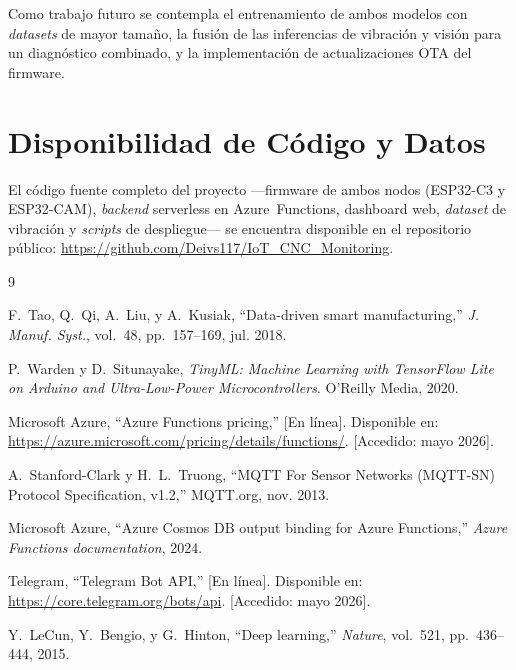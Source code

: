 \documentclass[journal,transmag]{IEEEtran}
\begin{document}
Como trabajo futuro se contempla el entrenamiento de ambos modelos con
\textit{datasets} de mayor tama\~no, la fusi\'on de las inferencias de vibraci\'on
y visi\'on para un diagn\'ostico combinado, y la implementaci\'on de
actualizaciones OTA del firmware.



\section*{Disponibilidad de C\'odigo y Datos}

El c\'odigo fuente completo del proyecto ---firmware de ambos nodos
(ESP32-C3 y ESP32-CAM), \textit{backend} serverless en Azure~Functions,
dashboard web, \textit{dataset} de vibraci\'on y \textit{scripts} de
despliegue--- se encuentra disponible en el repositorio p\'ublico:
\url{https://github.com/Deivs117/IoT_CNC_Monitoring}.



\begin{thebibliography}{9}

F.~Tao, Q.~Qi, A.~Liu, y A.~Kusiak,
``Data-driven smart manufacturing,''
\textit{J. Manuf. Syst.}, vol.~48, pp.~157--169, jul. 2018.

P.~Warden y D.~Situnayake,
\textit{TinyML: Machine Learning with TensorFlow Lite on Arduino and
Ultra-Low-Power Microcontrollers}.
O'Reilly Media, 2020.

Microsoft Azure, ``Azure Functions pricing,''
[En l\'inea]. Disponible en:
\url{https://azure.microsoft.com/pricing/details/functions/}.
[Accedido: mayo 2026].

A.~Stanford-Clark y H.~L.~Truong,
``MQTT For Sensor Networks (MQTT-SN) Protocol Specification, v1.2,''
MQTT.org, nov. 2013.

Microsoft Azure,
``Azure Cosmos DB output binding for Azure Functions,''
\textit{Azure Functions documentation}, 2024.

Telegram, ``Telegram Bot API,''
[En l\'inea]. Disponible en: \url{https://core.telegram.org/bots/api}.
[Accedido: mayo 2026].

Y.~LeCun, Y.~Bengio, y G.~Hinton,
``Deep learning,''
\textit{Nature}, vol.~521, pp.~436--444, 2015.

\end{thebibliography}
\end{document}
